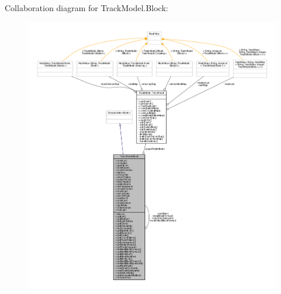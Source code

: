 Collaboration diagram for Track\+Model.\+Block\+:
\nopagebreak
\begin{figure}[H]
\begin{center}
\leavevmode
\includegraphics[width=350pt]{classTrackModel_1_1Block__coll__graph}
\end{center}
\end{figure}
